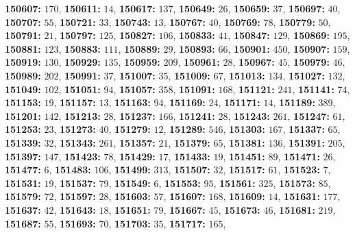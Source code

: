 \textsf{\bfseries 150607:} $170$, \textsf{\bfseries 150611:} $14$, \textsf{\bfseries 150617:} $137$, \textsf{\bfseries 150649:} $26$, \textsf{\bfseries 150659:} $37$, \textsf{\bfseries 150697:} $40$, \textsf{\bfseries 150707:} $55$, \textsf{\bfseries 150721:} $33$, \textsf{\bfseries 150743:} $13$, \textsf{\bfseries 150767:} $40$, \textsf{\bfseries 150769:} $78$, \textsf{\bfseries 150779:} $50$, \textsf{\bfseries 150791:} $21$, \textsf{\bfseries 150797:} $125$, \textsf{\bfseries 150827:} $106$, \textsf{\bfseries 150833:} $41$, \textsf{\bfseries 150847:} $129$, \textsf{\bfseries 150869:} $195$, \textsf{\bfseries 150881:} $123$, \textsf{\bfseries 150883:} $111$, \textsf{\bfseries 150889:} $29$, \textsf{\bfseries 150893:} $66$, \textsf{\bfseries 150901:} $450$, \textsf{\bfseries 150907:} $159$, \textsf{\bfseries 150919:} $130$, \textsf{\bfseries 150929:} $135$, \textsf{\bfseries 150959:} $209$, \textsf{\bfseries 150961:} $28$, \textsf{\bfseries 150967:} $45$, \textsf{\bfseries 150979:} $46$, \textsf{\bfseries 150989:} $202$, \textsf{\bfseries 150991:} $37$, \textsf{\bfseries 151007:} $35$, \textsf{\bfseries 151009:} $67$, \textsf{\bfseries 151013:} $134$, \textsf{\bfseries 151027:} $132$, \textsf{\bfseries 151049:} $102$, \textsf{\bfseries 151051:} $94$, \textsf{\bfseries 151057:} $358$, \textsf{\bfseries 151091:} $168$, \textsf{\bfseries 151121:} $241$, \textsf{\bfseries 151141:} $74$, \textsf{\bfseries 151153:} $19$, \textsf{\bfseries 151157:} $13$, \textsf{\bfseries 151163:} $94$, \textsf{\bfseries 151169:} $24$, \textsf{\bfseries 151171:} $14$, \textsf{\bfseries 151189:} $389$, \textsf{\bfseries 151201:} $142$, \textsf{\bfseries 151213:} $28$, \textsf{\bfseries 151237:} $166$, \textsf{\bfseries 151241:} $28$, \textsf{\bfseries 151243:} $261$, \textsf{\bfseries 151247:} $61$, \textsf{\bfseries 151253:} $23$, \textsf{\bfseries 151273:} $40$, \textsf{\bfseries 151279:} $12$, \textsf{\bfseries 151289:} $546$, \textsf{\bfseries 151303:} $167$, \textsf{\bfseries 151337:} $65$, \textsf{\bfseries 151339:} $32$, \textsf{\bfseries 151343:} $261$, \textsf{\bfseries 151357:} $21$, \textsf{\bfseries 151379:} $65$, \textsf{\bfseries 151381:} $136$, \textsf{\bfseries 151391:} $205$, \textsf{\bfseries 151397:} $147$, \textsf{\bfseries 151423:} $78$, \textsf{\bfseries 151429:} $17$, \textsf{\bfseries 151433:} $19$, \textsf{\bfseries 151451:} $89$, \textsf{\bfseries 151471:} $26$, \textsf{\bfseries 151477:} $6$, \textsf{\bfseries 151483:} $106$, \textsf{\bfseries 151499:} $313$, \textsf{\bfseries 151507:} $32$, \textsf{\bfseries 151517:} $61$, \textsf{\bfseries 151523:} $7$, \textsf{\bfseries 151531:} $19$, \textsf{\bfseries 151537:} $79$, \textsf{\bfseries 151549:} $6$, \textsf{\bfseries 151553:} $95$, \textsf{\bfseries 151561:} $325$, \textsf{\bfseries 151573:} $85$, \textsf{\bfseries 151579:} $72$, \textsf{\bfseries 151597:} $28$, \textsf{\bfseries 151603:} $57$, \textsf{\bfseries 151607:} $168$, \textsf{\bfseries 151609:} $14$, \textsf{\bfseries 151631:} $177$, \textsf{\bfseries 151637:} $42$, \textsf{\bfseries 151643:} $18$, \textsf{\bfseries 151651:} $79$, \textsf{\bfseries 151667:} $45$, \textsf{\bfseries 151673:} $46$, \textsf{\bfseries 151681:} $219$, \textsf{\bfseries 151687:} $55$, \textsf{\bfseries 151693:} $70$, \textsf{\bfseries 151703:} $35$, \textsf{\bfseries 151717:} $165$, 
